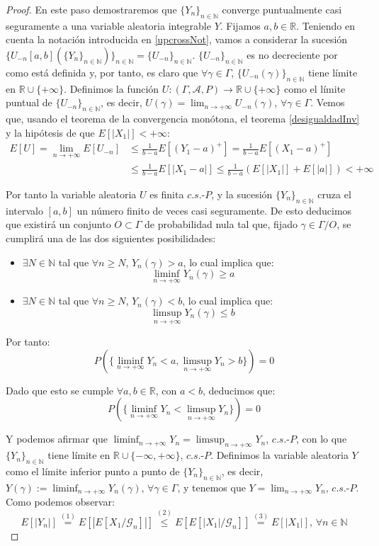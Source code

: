 \begin{proof}
En este paso demostraremos que $\{Y_n\}_{n\in\mathds{N}}$ converge puntualmente casi seguramente a una variable aleatoria integrable $Y$. Fijamos $a,b\in \mathds{R}$. Teniendo en cuenta la notación introducida en \ref{upcrossNot}, vamos a considerar la sucesión $\{U_{-n}[a,b](\{Y_n\}_{n\in\mathds{N}})\}_{n\in\mathds{N}} = \{U_{-n}\}_{n\in\mathds{N}}$. $\{U_{-n}\}_{n\in\mathds{N}}$ es no decreciente por como está definida y, por tanto, es claro que $\forall \gamma \in\Gamma$, $\{U_{-n}(\gamma)\}_{n\in\mathds{N}}$ tiene límite en $\mathds{R}\cup \{+\infty\}$. Definimos la función $U:(\Gamma , \mathcal{A},P)\rightarrow \mathds{R}\cup \{+\infty\}$ como el límite puntual de $\{U_{-n}\}_{n\in\mathds{N}}$, es decir, $U(\gamma)=\lim_{n\to +\infty} U_{-n}(\gamma)$, $\forall \gamma\in\Gamma$. Vemos que, usando el teorema de la convergencia monótona, el teorema \ref{desigualdadInv} y la hipótesis de que $E[|X_1|]<+\infty$:
\begin{align*}
E[U]=\lim_{n\to +\infty}E[U_{-n}]&\leq \frac{1}{b-a}E[(Y_1-a)^+] = \frac{1}{b-a}E[(X_1-a)^+]\\
&\leq \frac{1}{b-a}E[|X_1-a|]\leq \frac{1}{b-a}(E[|X_1|] + E[|a|]) < +\infty
\end{align*}

Por tanto la variable aleatoria $U$ es finita $c.s.\text{-}P$, y la sucesión $\{Y_n\}_{n\in\mathds{N}}$ cruza el intervalo $[a,b]$ un número finito de veces casi seguramente. De esto deducimos que existirá un conjunto $O\subset \Gamma$ de probabilidad nula tal que, fijado $\gamma\in \Gamma/O$, se cumplirá una de las dos siguientes posibilidades:
\begin{itemize}
\item $\exists N\in \mathds{N}$ tal que $\forall n\geq N$, $Y_n(\gamma)>a$, lo cual implica que:
$$\liminf_{n\to +\infty} Y_n(\gamma) \geq a$$
\item $\exists N\in \mathds{N}$ tal que $\forall n\geq N$, $Y_n(\gamma)<b$, lo cual implica que:
$$\limsup_{n\to +\infty} Y_n(\gamma) \leq b$$
\end{itemize}

Por tanto:
$$P(\{\liminf_{n\to +\infty}  Y_n < a, \limsup_{n\to +\infty}  Y_n > b\}) = 0 $$

Dado que esto se cumple $\forall a,b \in \mathds{R}$, con $a<b$, deducimos que:
$$P(\{\liminf_{n\to +\infty}  Y_n < \limsup_{n\to +\infty}  Y_n \}) = 0 $$

Y podemos afirmar que $\liminf_{n\to +\infty}  Y_n = \limsup_{n\to +\infty}  Y_n$, $c.s.\text{-}P$, con lo que $\{Y_n\}_{n\in\mathds{N}}$ tiene límite en $\mathds{R}\cup \{-\infty, +\infty\}$, $c.s.\text{-}P$. Definimos la variable aleatoria $Y$ como el límite inferior punto a punto de $\{Y_n\}_{n\in\mathds{N}}$, es decir, $Y(\gamma) := \liminf_{n\to +\infty}  Y_n(\gamma)$, $\forall \gamma\in\Gamma$, y tenemos que $Y = \lim_{n\to +\infty}  Y_n$, $c.s.\text{-}P$. Como podemos observar:
$$E[|Y_n|] \overset{(1)}{=} E[|E[X_1/\mathscr{G}_n]|]\overset{(2)}{\leq}E[E[|X_1|/\mathscr{G}_n]]\overset{(3)}{=}E[|X_1|]\text{, }\forall n\in\mathds{N}$$


\end{proof}
